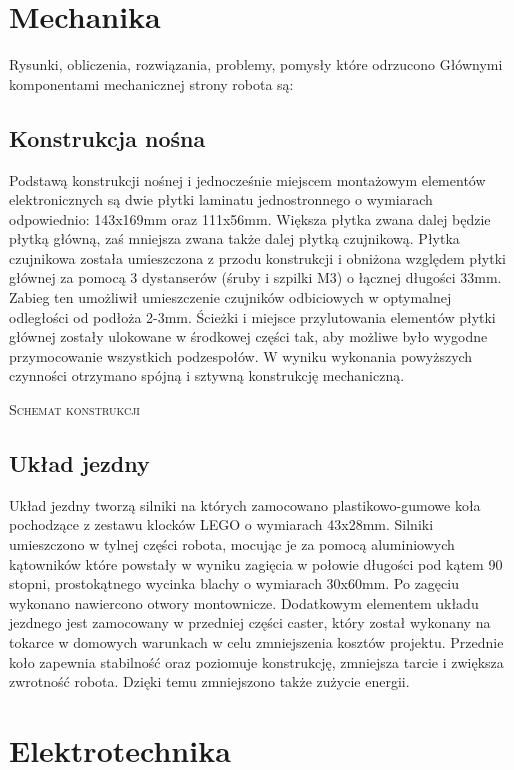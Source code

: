 \documentclass[11pt,a4paper]{article}
\begin{document}
\section{Mechanika}
Rysunki, obliczenia, rozwiązania, problemy, pomysły które odrzucono
  Głównymi komponentami mechanicznej strony robota są:
  \subsection{Konstrukcja nośna}
  Podstawą konstrukcji nośnej i jednocześnie miejscem montażowym elementów elektronicznych są dwie płytki laminatu jednostronnego o wymiarach odpowiednio: 143x169mm oraz 111x56mm. Większa płytka zwana dalej będzie płytką główną, zaś mniejsza zwana także dalej płytką czujnikową. Płytka czujnikowa została umieszczona z przodu konstrukcji i obniżona względem płytki głównej za pomocą 3 dystanserów (śruby i szpilki M3) o łącznej długości 33mm. Zabieg ten umożliwił umieszczenie czujników odbiciowych w optymalnej odległości od podłoża 2-3mm.
  Ścieżki i miejsce przylutowania elementów płytki głównej zostały ulokowane w środkowej części tak, aby możliwe było wygodne przymocowanie wszystkich podzespołów. 
  W wyniku wykonania powyższych czynności otrzymano spójną i sztywną konstrukcję mechaniczną.
  
  \textsc{Schemat konstrukcji}
  
  \subsection{Układ jezdny}
  Układ jezdny tworzą silniki na których zamocowano plastikowo-gumowe koła pochodzące z zestawu klocków LEGO o wymiarach 43x28mm.
  Silniki umieszczono w tylnej części robota, mocując je za pomocą aluminiowych kątowników które powstały w wyniku zagięcia w połowie długości pod kątem 90 stopni, prostokątnego wycinka blachy o wymiarach 30x60mm. Po zagęciu wykonano nawiercono otwory montownicze.
  Dodatkowym elementem układu jezdnego jest zamocowany w przedniej części caster, który został wykonany na tokarce w domowych warunkach w celu zmniejszenia kosztów projektu. Przednie koło zapewnia stabilność oraz poziomuje konstrukcję, zmniejsza tarcie i zwiększa zwrotność robota. Dzięki temu zmniejszono także zużycie energii.
  
  
\section{Elektrotechnika}
\end{document}

